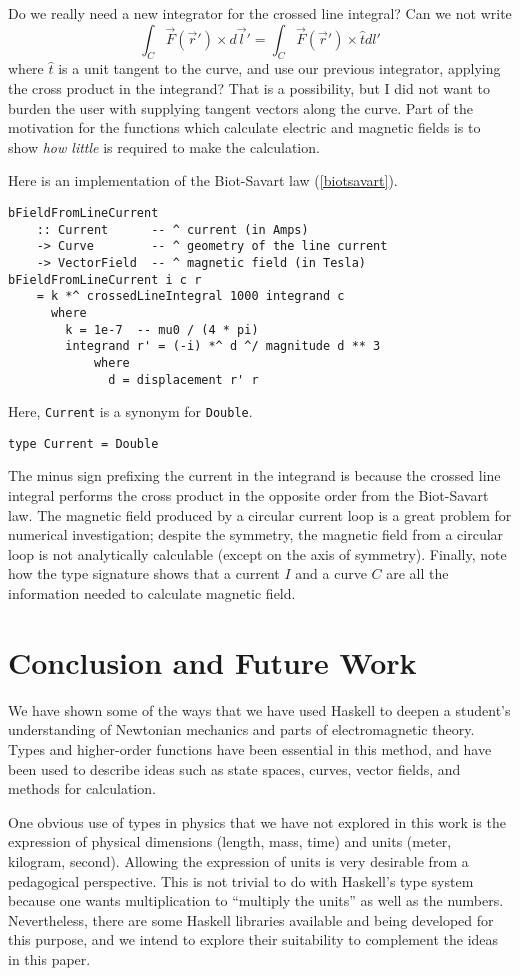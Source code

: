 \documentclass{eptcs}
\begin{document}
Do we really need a new integrator for the crossed line integral?
Can we not write 
\[
\int_C \vec{F}(\vec{r}') \times d\vec{l}' = \int_C \vec{F}(\vec{r}') \times \hat{t} dl'
\]
where $\hat{t}$ is a unit tangent to the curve, and use our previous integrator,
applying the cross product in the integrand?
That is a possibility, but I did not want to burden the user with supplying
tangent vectors along the curve.  Part of the motivation for the functions
which calculate electric and magnetic fields is to show \emph{how little}
is required to make the calculation.

Here is an implementation of the Biot-Savart law (\ref{biotsavart}).
\begin{verbatim}
bFieldFromLineCurrent
    :: Current      -- ^ current (in Amps)
    -> Curve        -- ^ geometry of the line current
    -> VectorField  -- ^ magnetic field (in Tesla)
bFieldFromLineCurrent i c r
    = k *^ crossedLineIntegral 1000 integrand c
      where
        k = 1e-7  -- mu0 / (4 * pi)
        integrand r' = (-i) *^ d ^/ magnitude d ** 3
            where
              d = displacement r' r
\end{verbatim}
Here, \verb|Current| is a synonym for \verb|Double|.
\begin{verbatim}
type Current = Double
\end{verbatim}
The minus sign prefixing the current in the integrand is because the crossed line integral
performs the cross product in the opposite order from the Biot-Savart law.
The magnetic field produced by a circular current loop is a great problem for
numerical investigation; despite the symmetry, the magnetic field from a circular loop is not
analytically calculable (except on the axis of symmetry).
Finally, note how the type signature shows that a current $I$
and a curve $C$ are all the information needed to calculate magnetic field.

\section{Conclusion and Future Work}

We have shown some of the ways that we have used Haskell to deepen a student's
understanding of Newtonian mechanics and parts of electromagnetic theory.
Types and higher-order functions have been essential in this method,
and have been used to describe ideas such as state spaces, curves,
vector fields, and methods for calculation.

One obvious use of types in physics that we have not explored in this work
is the expression of physical dimensions (length, mass, time) and units
(meter, kilogram, second).  Allowing the expression of units is very
desirable from a pedagogical perspective.  This is not trivial to do
with Haskell's type system because one wants multiplication to
``multiply the units'' as well as the numbers.  Nevertheless, there
are some Haskell libraries available and being developed for this purpose,
and we intend to explore their suitability to complement the ideas
in this paper.
\end{document}
